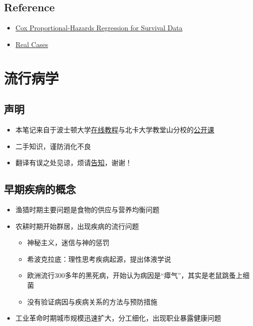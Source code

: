 \documentclass[]{book}
\providecommand{\tightlist}{%
  \setlength{\itemsep}{0pt}\setlength{\parskip}{0pt}}
\begin{document}
\hypertarget{reference}{%
\section{Reference}\label{reference}}

\begin{itemize}
\tightlist
\item
  \href{http://cran.r-project.org/doc/contrib/Fox-Companion/appendix-cox-regression.pdf}{Cox Proportional-Hazards Regression for Survival Data}
\item
  \href{http://ehp.niehs.nih.gov/1104049/}{Real Cases}
\end{itemize}

\hypertarget{epid}{%
\chapter{流行病学}\label{epid}}

\hypertarget{ux58f0ux660e}{%
\section{声明}\label{ux58f0ux660e}}

\begin{itemize}
\tightlist
\item
  本笔记来自于波士顿大学\href{http://sphweb.bumc.bu.edu/otlt/MPH-Modules/Modules_Menu.html}{在线教程}与北卡大学教堂山分校的\href{https://www.coursera.org/learn/epidemiology/outline}{公开课}
\item
  二手知识，谨防消化不良
\item
  翻译有误之处见谅，烦请\href{mailto:yufreecas@gmail.com}{告知}，谢谢！
\end{itemize}

\hypertarget{ux65e9ux671fux75beux75c5ux7684ux6982ux5ff5}{%
\section{早期疾病的概念}\label{ux65e9ux671fux75beux75c5ux7684ux6982ux5ff5}}

\begin{itemize}
\tightlist
\item
  渔猎时期主要问题是食物的供应与营养均衡问题
\item
  农耕时期开始群居，出现疾病的流行问题

  \begin{itemize}
  \tightlist
  \item
    神秘主义，迷信与神的惩罚
  \item
    希波克拉底：理性思考疾病起源，提出体液学说
  \item
    欧洲流行300多年的黑死病，开始认为病因是``瘴气''，其实是老鼠跳蚤上细菌
  \item
    没有验证病因与疾病关系的方法与预防措施
  \end{itemize}
\item
  工业革命时期城市规模迅速扩大，分工细化，出现职业暴露健康问题
\end{itemize}
\end{document}
